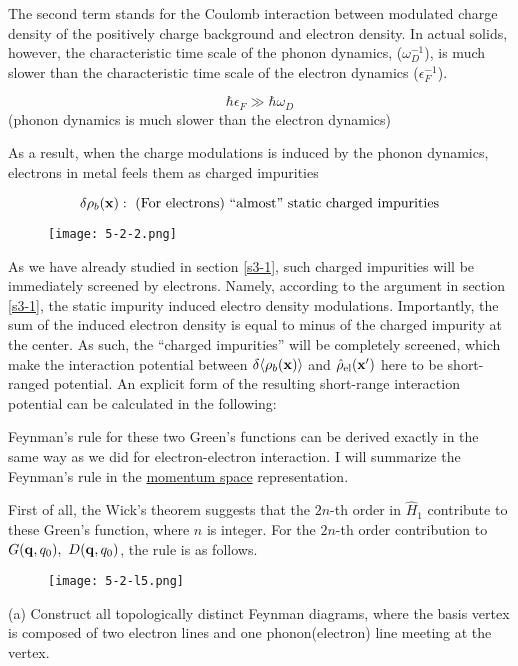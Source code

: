 The second term stands for the Coulomb interaction between modulated charge density of the positively charge background and electron density. In actual solids, however, the characteristic time scale of the phonon dynamics, ($\omega_D^{-1}$), is much slower than the characteristic time scale of the electron dynamics ($\epsilon_F^{-1}$). 

\[\hbar\epsilon_F\gg\hbar\omega_D \]
(phonon dynamics is much slower than the electron dynamics)

As a result, when the charge modulations is induced by the phonon dynamics, electrons in metal feels them as  charged impurities

\[\delta\rho_b({\bf x}):\text{ (For electrons) ``almost'' static charged impurities} \]
\begin{wrapfigure}{r}{6cm}
\texttt{[image: 5-2-2.png]}
\end{wrapfigure}
As we have already studied in section \ref{s3-1}, such charged impurities will be immediately screened by electrons. Namely, according to the argument in section \ref{s3-1}, the static impurity induced electro density modulations. Importantly, the sum of the induced electron density is equal to minus of the charged impurity at the center. As such, the ``charged impurities'' will be completely screened, which make the interaction potential between $\delta\langle\rho_b(\bf x)\rangle$ and $\hat{\rho}_{\text{el}}(\bf x')$ here to be short-ranged potential. An explicit form of the resulting short-range interaction potential can be calculated in the following:


Feynman's rule for these two Green's functions can be derived exactly in the same way as we did for electron-electron interaction. I will summarize the Feynman's rule in the \uline{momentum space} representation. 

First of all, the Wick's theorem suggests that the $2n$-th order in $\hat{H}_1$ contribute to these Green's function, where $n$ is integer. For the $2n$-th order contribution to $G({\bf q},q_0),\ D({\bf q},q_0)$, the rule is as follows. 

\begin{wrapfigure}{l}{4cm}
\texttt{[image: 5-2-l5.png]}
\end{wrapfigure}
\noindent (a) Construct all topologically distinct Feynman diagrams, where the basis vertex is composed of two electron lines and one phonon(electron) line meeting at the vertex. 

